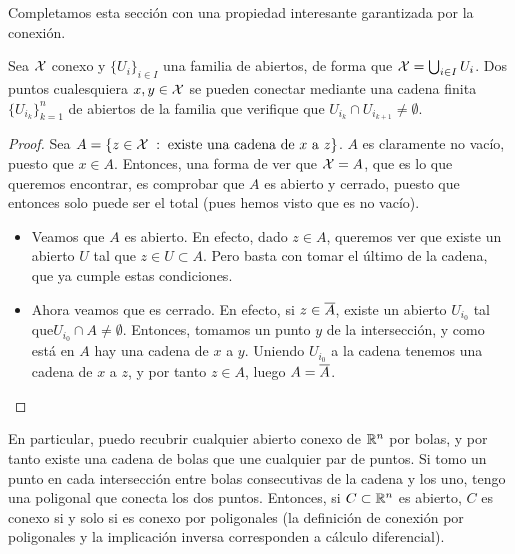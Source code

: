 Completamos esta sección con una propiedad interesante garantizada por la conexión.

\begin{lem}
	Sea $\mathcal{X}$ conexo y $\{U_i\}_{i\in I}$ una familia de abiertos, de forma que $\mathcal{X}=\bigcup_{i\in I} U_i$. Dos puntos cualesquiera $x,y\in\mathcal{X}$ se pueden conectar mediante una cadena finita $\{U_{i_k}\}_{k=1}^n$ de abiertos de la familia que verifique que $U_{i_k}\cap U_{i_{k+1}}\neq\emptyset$.
	
	\begin{proof}
		Sea $A=\{z\in\mathcal{X} \;:\; \text{existe una cadena de } x \text{ a } z \}$. $A$ es claramente no vacío, puesto que $x\in A$. Entonces, una forma de ver que $\mathcal{X}=A$, que es lo que queremos encontrar, es comprobar que $A$ es abierto y cerrado, puesto que entonces solo puede ser el total (pues hemos visto que es no vacío).
		
		\begin{itemize}
			\item Veamos que $A$ es abierto. En efecto, dado $z\in A$, queremos ver que existe un abierto $U$ tal que $z\in U\subset A$. Pero basta con tomar el último de la cadena, que ya cumple estas condiciones.
			
			\item Ahora veamos que es cerrado. En efecto, si $z\in\overline{A}$, existe un abierto $U_{i_0}$ tal que$U_{i_0}\cap A\neq\emptyset$. Entonces, tomamos un punto $y$ de la intersección, y como está en $A$ hay una cadena de $x$ a $y$. Uniendo $U_{i_0}$ a la cadena tenemos una cadena de $x$ a $z$, y por tanto $z\in A$, luego $A=\overline{A}$. \qedhere
		\end{itemize}
	\end{proof}
\end{lem}

\begin{obs}
	En particular, puedo recubrir cualquier abierto conexo de $\mathbb{R}^n$ por bolas, y por tanto existe una cadena de bolas que une cualquier par de puntos. Si tomo un punto en cada intersección entre bolas consecutivas de la cadena y los uno, tengo una poligonal que conecta los dos puntos. Entonces, si $C\subset\mathbb{R}^n$ es abierto, $C$ es conexo si y solo si es conexo por poligonales (la definición de conexión por poligonales y la implicación inversa corresponden a cálculo diferencial).
\end{obs}


